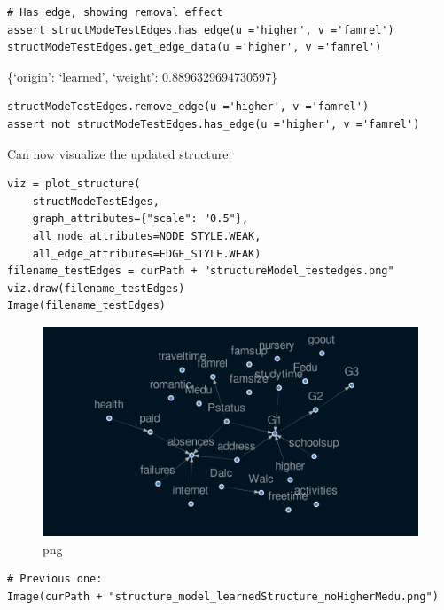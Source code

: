 \documentclass[
]{article}
\begin{document}
\begin{verbatim}
# Has edge, showing removal effect
assert structModeTestEdges.has_edge(u ='higher', v ='famrel')
structModeTestEdges.get_edge_data(u ='higher', v ='famrel')
\end{verbatim}

\{`origin': `learned', `weight': 0.8896329694730597\}

\begin{verbatim}
structModeTestEdges.remove_edge(u ='higher', v ='famrel')
assert not structModeTestEdges.has_edge(u ='higher', v ='famrel')
\end{verbatim}

Can now visualize the updated structure:

\begin{verbatim}
viz = plot_structure(
    structModeTestEdges,
    graph_attributes={"scale": "0.5"},
    all_node_attributes=NODE_STYLE.WEAK,
    all_edge_attributes=EDGE_STYLE.WEAK)
filename_testEdges = curPath + "structureModel_testedges.png"
viz.draw(filename_testEdges)
Image(filename_testEdges)
\end{verbatim}

\begin{figure}
\centering
\includegraphics{FirstCausalNexTutorial_files/FirstCausalNexTutorial_95_0.png}
\caption{png}
\end{figure}

\begin{verbatim}
# Previous one:
Image(curPath + "structure_model_learnedStructure_noHigherMedu.png")
\end{verbatim}
\end{document}

